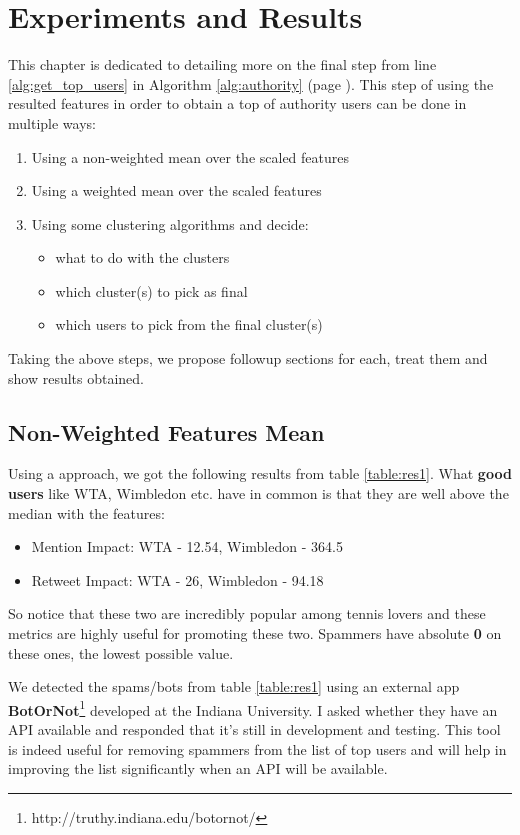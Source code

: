 \chapter{Experiments and Results}
\label{sec:results}

This chapter is dedicated to detailing more on the final step from line \ref{alg:get_top_users} in Algorithm \ref{alg:authority} (page \pageref{alg:authority}). This step of using the resulted features in order to obtain a top of authority users can be done in multiple ways:
\begin{enumerate}
	\item Using a non-weighted mean over the scaled features
    \item Using a weighted mean over the scaled features
    \item Using some clustering algorithms and decide:
    \begin{itemize}
    	\item what to do with the clusters
        \item which cluster(s) to pick as final
        \item which users to pick from the final cluster(s)
    \end{itemize}
\end{enumerate}

Taking the above steps, we propose followup sections for each, treat them and show results obtained.

\section{Non-Weighted Features Mean}

Using a  approach, we got the following results from table \ref{table:res1}. What \textbf{good users} like WTA, Wimbledon etc. have in common is that they are well above the median with the features:
\begin{itemize}
	\item Mention Impact: WTA - 12.54, Wimbledon - 364.5
    \item Retweet Impact: WTA - 26, Wimbledon - 94.18
\end{itemize}

So notice that these two are incredibly popular among tennis lovers and these metrics are highly useful for promoting these two. Spammers have absolute \textbf{0} on these ones, the lowest possible value.

We detected the spams/bots from table \ref{table:res1} using an external app \textbf{BotOrNot}\footnote{\label{fn:botornot}http://truthy.indiana.edu/botornot/} developed at the Indiana University. I asked whether they have an API available and responded that it's still in development and testing. This tool is indeed useful for removing spammers from the list of top users and will help in improving the list significantly when an API will be available.

